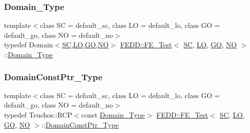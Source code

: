 \mbox{\label{classFEDD_1_1FE__Test_a5e414af507a141db0961c32bf6b19825}} 
\subsubsection{\texorpdfstring{Domain\+\_\+\+Type}{Domain\_Type}}
{\footnotesize\ttfamily template$<$class SC  = default\+\_\+sc, class LO  = default\+\_\+lo, class GO  = default\+\_\+go, class NO  = default\+\_\+no$>$ \\
typedef Domain$<$\hyperlink{fe__test__laplace_8cpp_a79c7e86a57edbb2a5a53242bcd04e41e}{SC},\hyperlink{fe__test__laplace_8cpp_ad6a38c9f07d3fd633eefca5bccad8410}{LO},\hyperlink{fe__test__laplace_8cpp_afa2946b509009b4f45eb04bd8c5b27d9}{GO},\hyperlink{fe__test__laplace_8cpp_a5e24f37b28787429872b6ecb1d0417ce}{NO}$>$ \hyperlink{classFEDD_1_1FE__Test}{F\+E\+D\+D\+::\+F\+E\+\_\+\+Test}$<$ \hyperlink{fe__test__laplace_8cpp_a79c7e86a57edbb2a5a53242bcd04e41e}{SC}, \hyperlink{fe__test__laplace_8cpp_ad6a38c9f07d3fd633eefca5bccad8410}{LO}, \hyperlink{fe__test__laplace_8cpp_afa2946b509009b4f45eb04bd8c5b27d9}{GO}, \hyperlink{fe__test__laplace_8cpp_a5e24f37b28787429872b6ecb1d0417ce}{NO} $>$\+::\hyperlink{classFEDD_1_1FE__Test_a5e414af507a141db0961c32bf6b19825}{Domain\+\_\+\+Type}}

\mbox{\label{classFEDD_1_1FE__Test_a0a941851908a1e68d1554f8b28a7c72a}} 
\subsubsection{\texorpdfstring{Domain\+Const\+Ptr\+\_\+\+Type}{DomainConstPtr\_Type}}
{\footnotesize\ttfamily template$<$class SC  = default\+\_\+sc, class LO  = default\+\_\+lo, class GO  = default\+\_\+go, class NO  = default\+\_\+no$>$ \\
typedef Teuchos\+::\+R\+CP$<$const \hyperlink{classFEDD_1_1FE__Test_a5e414af507a141db0961c32bf6b19825}{Domain\+\_\+\+Type}$>$ \hyperlink{classFEDD_1_1FE__Test}{F\+E\+D\+D\+::\+F\+E\+\_\+\+Test}$<$ \hyperlink{fe__test__laplace_8cpp_a79c7e86a57edbb2a5a53242bcd04e41e}{SC}, \hyperlink{fe__test__laplace_8cpp_ad6a38c9f07d3fd633eefca5bccad8410}{LO}, \hyperlink{fe__test__laplace_8cpp_afa2946b509009b4f45eb04bd8c5b27d9}{GO}, \hyperlink{fe__test__laplace_8cpp_a5e24f37b28787429872b6ecb1d0417ce}{NO} $>$\+::\hyperlink{classFEDD_1_1FE__Test_a0a941851908a1e68d1554f8b28a7c72a}{Domain\+Const\+Ptr\+\_\+\+Type}}

